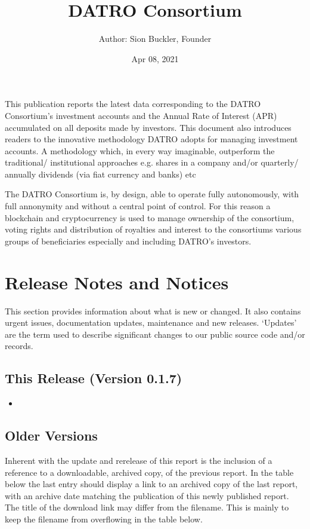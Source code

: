 \documentclass[letterpaper,10pt,openany,oneside,english]{sphinxmanual}
\title{DATRO Consortium}
\date{Apr 08, 2021}
\author{Author: Sion Buckler, Founder}
\begin{document}
\pagestyle{empty}
\sphinxmaketitle
\pagestyle{plain}
\sphinxtableofcontents
\pagestyle{normal}
\label{\detokenize{index::doc}}


\sphinxAtStartPar
This publication reports the latest data corresponding to the DATRO Consortium’s investment accounts and the Annual Rate of Interest (APR) accumulated on all deposits made by investors.
This document also introduces readers to the innovative methodology DATRO adopts for managing investment accounts. A methodology which, in every way imaginable, outperform the traditional/ institutional approaches e.g. shares in a company and/or quarterly/ annually dividends (via fiat currency and banks) etc

\sphinxAtStartPar
The DATRO Consortium is, by design, able to operate fully autonomously, with full annonymity and without a central point of control.
For this reason a blockchain and cryptocurrency is used to manage ownership of the consortium, voting rights and distribution of royalties and interest to the consortiums various groups of beneficiaries \sphinxhyphen{} especially and including DATRO’s investors.


\chapter{Release Notes and Notices}
\label{\detokenize{releasenotes:release-notes-and-notices}}\label{\detokenize{releasenotes::doc}}
\sphinxAtStartPar
This section provides information about what is new or changed.
It also contains urgent issues, documentation updates, maintenance and new releases.
‘Updates’ are the term used to describe significant changes to our public source code and/or records.


\section{This Release (Version 0.1.7)}
\label{\detokenize{releasenotes:this-release-version-0-1-7}}\begin{itemize}
\item {} 
\sphinxAtStartPar
{} \sphinxhyphen{} 

\end{itemize}


\section{Older Versions}
\label{\detokenize{releasenotes:older-versions}}
\sphinxAtStartPar
Inherent with the update and re\sphinxhyphen{}release of this report is the inclusion of a reference to a downloadable, archived copy, of the previous report.
In the table below the last entry should display a link to an archived copy of the last report, with an archive date matching the publication of this newly published report.
The title of the download link may differ from the filename. This is mainly to keep the filename from overflowing in the table below.
\end{document}
